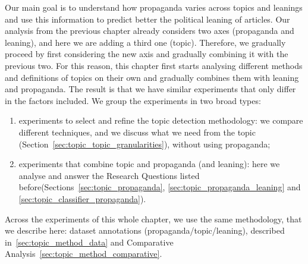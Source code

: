 Our main goal is to understand how propaganda varies across topics and leanings and use this information to predict better the political leaning of articles.
Our analysis from the previous chapter already considers two axes (propaganda and leaning), and here we are adding a third one (topic).
Therefore, we gradually proceed by first considering the new axis and gradually combining it with the previous two.
For this reason, this chapter first starts analysing different methods and definitions of topics on their own and gradually combines them with leaning and propaganda. The result is that we have similar experiments that only differ in the factors included.
We group the experiments in two broad types:
\begin{enumerate}
    \item experiments to select and refine the topic detection methodology: we compare different techniques, and we discuss what we need from the topic (Section~\ref{sec:topic_topic_granularities}), without using propaganda; 
    \item experiments that combine topic and propaganda (and leaning): here we analyse and answer the Research Questions listed before(Sections~\ref{sec:topic_propaganda}, \ref{sec:topic_propaganda_leaning} and \ref{sec:topic_classifier_propaganda}).
\end{enumerate}




Across the experiments of this whole chapter, we use the same methodology, that we describe here: dataset annotations (propaganda/topic/leaning), described in~\ref{sec:topic_method_data} and Comparative Analysis~\ref{sec:topic_method_comparative}.


